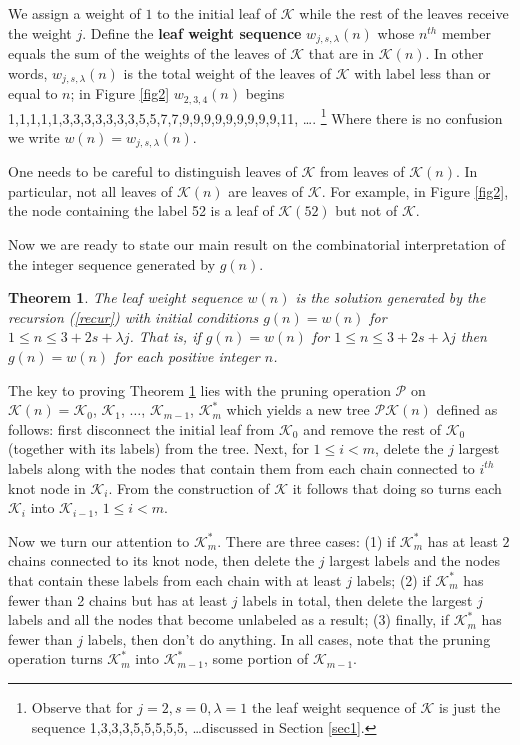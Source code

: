 \documentclass[12pt]{amsart}
\newtheorem{theorem}{Theorem}[section]
\numberwithin{equation}{section}
\numberwithin{theorem}{section}
\numberwithin{table}{section}
\numberwithin{figure}{section}
\begin{document}
We assign a weight of $1$ to the initial leaf of ${\mathcal K}$ while the rest of the leaves receive the weight $j$. Define the \textbf{leaf weight sequence} $w_{j,s,\lambda}(n)$ whose $n^{th}$ member equals the sum of the weights of the leaves of ${\mathcal K}$ that are in ${\mathcal K}(n)$. In other words, $w_{j,s,\lambda}(n)$ is the total weight of the leaves of ${\mathcal K}$ with label less than or equal to $n$; in Figure \ref{fig2} $w_{2,3,4}(n)$ begins 1,1,1,1,1,3,3,3,3,3,3,3,5,5,7,7,9,9,9,9,9,9,9,9,9,11, \ldots. \footnote{Observe that for $j=2, s=0, \lambda=1$ the leaf weight sequence of ${\mathcal K}$ is just the sequence 1,3,3,3,5,5,5,5,5, \ldots discussed in Section \ref{sec1}.} Where there is no confusion we write $w(n)=w_{j,s,\lambda}(n)$.

One needs to be careful to distinguish leaves of ${\mathcal K}$ from leaves of ${\mathcal K}(n)$. In particular, not all leaves of ${\mathcal K}(n)$ are leaves of ${\mathcal K}$. For example, in Figure \ref{fig2}, the node containing the label 52 is a leaf of ${\mathcal K}(52)$ but not of ${\mathcal K}$.

Now we are ready to state our main result on the combinatorial interpretation of the integer sequence generated by $g(n)$.

\begin{theorem} The leaf weight sequence $w(n)$ is the solution generated by the recursion (\ref{recur}) with initial conditions $g(n)= w(n)$ for $1\leq n \leq 3 +2s + \lambda j$. That is, if $g(n)=w(n)$ for $1\leq n \leq 3 +2s + \lambda j$ then $g(n)=w(n)$ for each positive integer $n$.
\label{thm:count}
\end{theorem}

The key to proving Theorem \ref{thm:count} lies with the pruning operation ${\mathcal P}$ on ${\mathcal K}(n) = {\mathcal K}_0$, ${\mathcal K}_1$, $\ldots$, ${\mathcal K}_{m-1}$, ${\mathcal K}^*_m$ which yields a new tree ${\mathcal P}{\mathcal K}(n)$ defined as follows: first disconnect the initial leaf from ${\mathcal K}_0$ and remove the rest of ${\mathcal K}_0$ (together with its labels) from the tree. Next, for $1 \leq i < m$, delete the $j$ largest labels along with the nodes that contain them from each chain connected to $i^{th}$ knot node in ${\mathcal K}_i$. From the construction of ${\mathcal K}$ it follows that doing so turns each ${\mathcal K}_i$ into ${\mathcal K}_{i-1}$, $1 \leq i < m$.

Now we turn our attention to ${\mathcal K}^*_m$. There are three cases: (1) if ${\mathcal K}^*_m$ has at least $2$ chains connected to its knot node, then delete the $j$ largest labels and the nodes that contain these labels from each chain with at least $j$ labels; (2) if ${\mathcal K}^*_m$ has fewer than 2 chains but has at least $j$ labels in total, then delete the largest $j$ labels and all the nodes that become unlabeled as a result; (3) finally, if ${\mathcal K}^*_m$ has fewer than $j$ labels, then don't do anything. In all cases, note that the pruning operation turns ${\mathcal K}^*_m$ into ${\mathcal K}^*_{m-1}$, some portion of ${\mathcal K}_{m-1}$.
\end{document}
